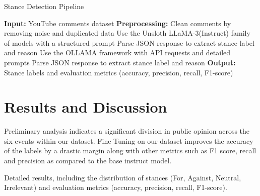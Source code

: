 \documentclass[sigconf, review]{acmart}
\begin{document}
\begin{algorithm}[h]
\caption{Stance Detection Pipeline}
\label{alg:pipeline}
\begin{algorithmic}[1]
\STATE \textbf{Input:} YouTube comments dataset
\STATE \textbf{Preprocessing:} Clean comments by removing noise and duplicated data
    \STATE Use the Unsloth LLaMA-3(Instruct) family of models with a structured prompt
    \STATE Parse JSON response to extract stance label and reason
\ELSE
    \STATE Use the OLLAMA framework with API requests and detailed prompts
    \STATE Parse JSON response to extract stance label and reason
\ENDIF
\STATE \textbf{Output:} Stance labels and evaluation metrics (accuracy, precision, recall, F1-score)
\end{algorithmic}
\end{algorithm}

\section{Results and Discussion}

Preliminary analysis indicates a significant division in public opinion across the six events within our dataset. 
Fine Tuning on our dataset improves the accuracy of the labels by a drastic margin along with other metrics such as F1 score, recall and precision as compared to the base instruct model.

Detailed results, including the distribution of stances (For, Against, Neutral, Irrelevant) and evaluation metrics (accuracy, precision, recall, F1-score).
\end{document}
